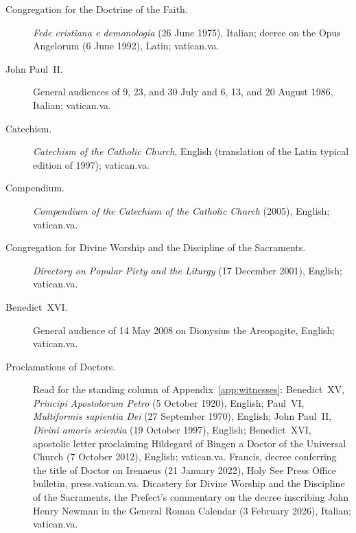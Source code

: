 \begin{description}
\item[Congregation for the Doctrine of the Faith.] \emph{Fede cristiana e
  demonologia} (26 June 1975), Italian; decree on the Opus Angelorum
  (6 June 1992), Latin; vatican.va.
\item[John Paul~II.] General audiences of 9, 23, and 30 July and 6, 13,
  and 20 August 1986, Italian; vatican.va.
\item[Catechism.] \emph{Catechism of the Catholic Church}, English
  (translation of the Latin typical edition of 1997); vatican.va.
\item[Compendium.] \emph{Compendium of the Catechism of the Catholic
  Church} (2005), English; vatican.va.
\item[Congregation for Divine Worship and the Discipline of the
  Sacraments.] \emph{Directory on Popular Piety and the Liturgy}
  (17 December 2001), English; vatican.va.
\item[Benedict~XVI.] General audience of 14 May 2008 on Dionysius the
  Areopagite, English; vatican.va.
\item[Proclamations of Doctors.] Read for the standing column of
  Appendix~\ref{app:witnesses}: Benedict~XV, \emph{Principi Apostolorum
  Petro} (5 October 1920), English; Paul~VI, \emph{Multiformis sapientia
  Dei} (27 September 1970), English; John Paul~II, \emph{Divini amoris
  scientia} (19 October 1997), English; Benedict~XVI, apostolic letter
  proclaiming Hildegard of Bingen a Doctor of the Universal Church
  (7 October 2012), English; vatican.va. Francis, decree conferring the
  title of Doctor on Irenaeus (21 January 2022), Holy See Press Office
  bulletin, press.vatican.va. Dicastery for Divine Worship and the
  Discipline of the Sacraments, the Prefect's commentary on the decree
  inscribing John Henry Newman in the General Roman Calendar
  (3 February 2026), Italian; vatican.va.
\end{description}

